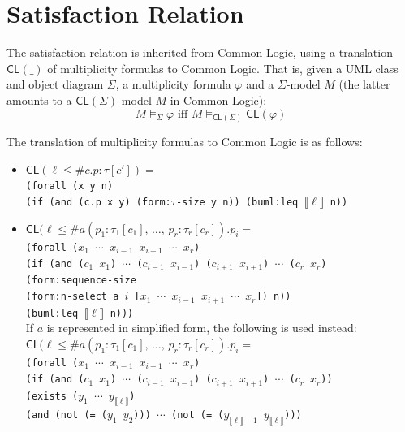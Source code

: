 \documentclass[10pt,fleqn,final]{scrreprt}
\newcommand*{\CL}{\ensuremath{\mathsf{CL}}\xspace}
\newenvironment{definitions}[0]{\medskip }{}
\newcommand{\sem}[1]{\mathopen\llbracket#1\mathclose\rrbracket}
\newcommand{\white}[1]{{\color{white}{#1}}}
\newcommand{\qqquad}{\white{x}\qquad}
\begin{document}
\begin{definitions}
\section{Satisfaction Relation}\label{a:UML-CD-sat}
The satisfaction relation is inherited from Common Logic, using
a translation $\CL(\_)$ of multiplicity formulas to Common Logic.
That is, given a UML class and object diagram $\Sigma$, a
multiplicity formula $\varphi$ and a $\Sigma$-model $M$ (the
latter amounts to a $\CL(\Sigma)$-model $M$ in Common Logic): 
$$M\models_\Sigma\varphi\text{ iff }M\models_{\CL(\Sigma)}\CL(\varphi)$$

The translation of multiplicity formulas to Common Logic is as follows:
\begin{itemize}
  \item  $\CL(\ell \leq \mathsf{\#}c\mathsf{.}p \mathrel{\mathsf{:}} \tau[c']) =$\\
\texttt{(forall (x y n)}\\
\qqquad\texttt{(if (and (c.p x y) (form:$\tau$-size y n)) (buml:leq $\sem{\ell}$ n))}
  \item $\CL(\ell \leq \mathsf{\#}a(p_1 \mathrel{\mathsf{:}} \tau_1[c_1]\mathsf{,}\, \dots\mathsf{,}\, p_r \mathrel{\mathsf{:}} \tau_r[c_r])\mathsf{.}p_i=$\\
\texttt{(forall ($x_1$ $\cdots$ $x_{i-1}$ $x_{i+1}$ $\cdots$ $x_r$)}\\
\qqquad\texttt{(if (and ($c_1$ $x_1$) $\cdots$ ($c_{i-1}$ $x_{i-1}$) ($c_{i+1}$ $x_{i+1}$) $\cdots$ ($c_r$ $x_r$)\\
\qqquad\qqquad\qqquad  (form:sequence-size \\
\qqquad\qqquad\qqquad\qqquad(form:n-select a $i$ [$x_1$ $\cdots$ $x_{i-1}$ $x_{i+1}$ $\cdots$ $x_r$]) n))\\
\qqquad\qqquad (buml:leq $\sem{\ell}$ n)))}\\
If $a$ is represented in simplified form, the following is used instead:\\
$\CL(\ell \leq \mathsf{\#}a(p_1 \mathrel{\mathsf{:}} \tau_1[c_1]\mathsf{,}\, \dots\mathsf{,}\, p_r \mathrel{\mathsf{:}} \tau_r[c_r])\mathsf{.}p_i=$\\
\texttt{(forall ($x_1$ $\cdots$ $x_{i-1}$ $x_{i+1}$ $\cdots$ $x_r$)\\
\qqquad(if (and ($c_1$ $x_1$) $\cdots$ ($c_{i-1}$ $x_{i-1}$) ($c_{i+1}$ $x_{i+1}$) $\cdots$ ($c_r$ $x_r$))\\
\qqquad\qqquad\qquad  (exists ($y_1$ $\cdots$ $y_{\sem{\ell}}$)\\
\qqquad\qqquad\qquad\qquad (and (not (= ($y_1$ $y_2$))) $\cdots$  (not (= ($y_{\sem{\ell}-1}$ $y_{\sem{\ell}}$))) \\
}
\end{itemize}
\end{definitions}
\end{document}
